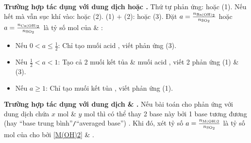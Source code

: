 \documentclass{article}
\begin{document}
\noindent\textbf{\textsf{Trường hợp  tác dụng với dung dịch  hoặc .}} Thứ tự phản ứng:  hoặc  (1). Nếu  hết mà vẫn sục khí  vào:  hoặc  (2). (1) $+$ (2):  hoặc  (3). Đặt $a = \frac{n_{\ce{Ba(OH)2}}}{n_{\ce{SO2}}}$ hoặc $a = \frac{n_{\ce{Ca(OH)2}}}{n_{\ce{SO2}}}$ là tỷ số mol của  \& :
\begin{itemize}
	\item Nếu $0 < a\le\frac{1}{2}$: Chỉ tạo muối acid , viết phản ứng (3).
	\item Nếu $\frac{1}{2} < a < 1$: Tạo cả 2 muối kết tủa  \& muối acid , viết 2 phản ứng (1) \& (3).
	\item Nếu $a\ge1$: Chỉ tạo muối kết tủa , viết phản ứng (1).
\end{itemize}
\textbf{\textsf{Trường hợp  tác dụng với dung dịch  \& .}} Nếu bài toán cho  phản ứng với dung dịch chứa $x$ mol  \& $y$ mol  thì có thể thay 2 base này bởi 1 base tương đương (hay ``base trung bình''{\tt/}``averaged base'') . Khi đó, xét tỷ số $a = \frac{n_{\rm M(OH)2}}{n_{\ce{SO2}}}$ là tỷ số mol của  cho bởi \eqref{M(OH)2} \& .
\end{document}
